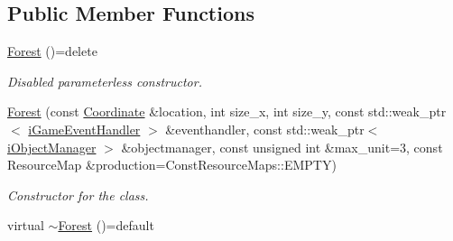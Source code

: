 \subsection*{Public Member Functions}
\begin{DoxyCompactItemize}
\item 
\hypertarget{class_course_1_1_forest_a479a9c69f82dcd8cc2d0db81f067472b}{\hyperlink{class_course_1_1_forest_a479a9c69f82dcd8cc2d0db81f067472b}{Forest} ()=delete}\label{class_course_1_1_forest_a479a9c69f82dcd8cc2d0db81f067472b}

\begin{DoxyCompactList}\small\item\em Disabled parameterless constructor. \end{DoxyCompactList}\item 
\hyperlink{class_course_1_1_forest_a0aad8b1708096f1d378f4cea1791f916}{Forest} (const \hyperlink{class_course_1_1_coordinate}{Coordinate} \&location, int size\-\_\-x, int size\-\_\-y, const std\-::weak\-\_\-ptr$<$ \hyperlink{class_course_1_1i_game_event_handler}{i\-Game\-Event\-Handler} $>$ \&eventhandler, const std\-::weak\-\_\-ptr$<$ \hyperlink{class_course_1_1i_object_manager}{i\-Object\-Manager} $>$ \&objectmanager, const unsigned int \&max\-\_\-unit=3, const Resource\-Map \&production=Const\-Resource\-Maps\-::\-E\-M\-P\-T\-Y)
\begin{DoxyCompactList}\small\item\em Constructor for the class. \end{DoxyCompactList}\item 
\hypertarget{class_course_1_1_forest_ac8e55f196786f07e92866e6ca1a6ae44}{virtual \hyperlink{class_course_1_1_forest_ac8e55f196786f07e92866e6ca1a6ae44}{$\sim$\-Forest} ()=default}\label{class_course_1_1_forest_ac8e55f196786f07e92866e6ca1a6ae44}


\end{DoxyCompactItemize}
